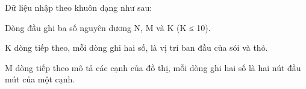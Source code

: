 Dữ liệu nhập theo khuôn dạng như sau:

Dòng đầu ghi ba số nguyên dương N, M và K (K ≤ 10).

K dòng tiếp theo, mỗi dòng ghi hai số, là vị trí ban đầu của sói và thỏ.

M dòng tiếp theo mô tả các cạnh của đồ thị, mỗi dòng ghi hai số là hai nút đầu mút của một cạnh.

\